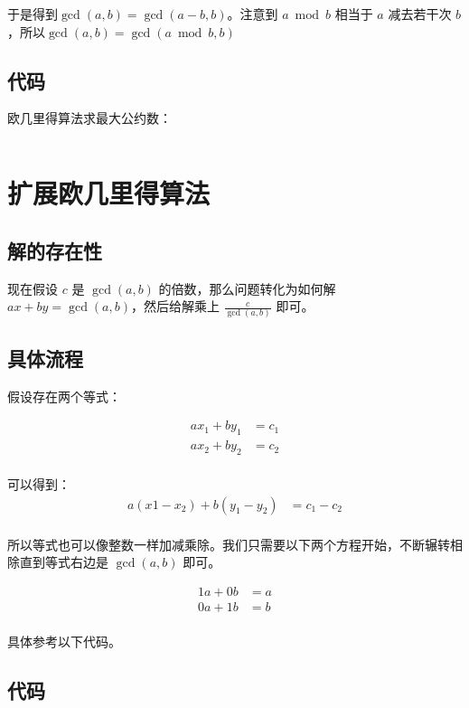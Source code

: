 \documentclass{article}
\begin{document}
于是得到$\gcd(a,b) = \gcd(a-b,b)$。注意到 $a\bmod b$ 相当于 $a$ 减去若干次 $b$，所以$\gcd(a,b) = \gcd(a\bmod b, b)$

\subsection*{代码}

欧几里得算法求最大公约数：
\inputminted[linenos,autogobble]{cpp}{gcd.cpp}


\section{扩展欧几里得算法}


\subsection*{解的存在性}

现在假设 $c$ 是 $\gcd(a,b)$ 的倍数，那么问题转化为如何解 $ax+by = \gcd(a,b)$，然后给解乘上 $\displaystyle \frac{c}{\gcd(a,b)}$ 即可。

\subsection*{具体流程}

假设存在两个等式：

\begin{align*}
    ax_1 + by_1 &= c_1\\
    ax_2 + by_2 &= c_2\\
\end{align*}

可以得到： 
\begin{align*}
    a(x1-x_2) + b(y_1-y_2) &= c_1-c_2\\
\end{align*}

所以等式也可以像整数一样加减乘除。我们只需要以下两个方程开始，不断辗转相除直到等式右边是 $\gcd(a,b)$ 即可。

\begin{align*}
    1a + 0b &= a\\
    0a + 1b &= b\\
\end{align*}
    
具体参考以下代码。
    
    
    

\subsection*{代码}
\inputminted[linenos,autogobble]{cpp}{exgcd.cpp}
\end{document}
